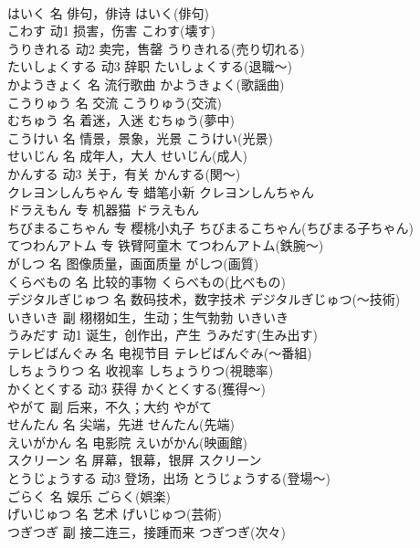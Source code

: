 \documentclass[8pt]{extreport}
\begin{document}
\begin{CJK}{UTF8}{min}
\\	はいく	名	俳句，俳诗	はいく(俳句)	
\\	こわす	动1	损害，伤害	こわす(壊す)	
\\	うりきれる	动2	卖完，售罄	うりきれる(売り切れる)	
\\	たいしょくする	动3	辞职	たいしょくする(退職～)	
\\	かようきょく	名	流行歌曲	かようきょく(歌謡曲)	
\\	こうりゅう	名	交流	こうりゅう(交流)	
\\	むちゅう	名	着迷，入迷	むちゅう(夢中)	
\\	こうけい	名	情景，景象，光景	こうけい(光景)	
\\	せいじん	名	成年人，大人	せいじん(成人)	
\\	かんする	动3	关于，有关	かんする(関～)	
\\	クレヨンしんちゃん	专	蜡笔小新	クレヨンしんちゃん	
\\	ドラえもん	专	机器猫	ドラえもん	
\\	ちびまるこちゃん	专	樱桃小丸子	ちびまるこちゃん(ちびまる子ちゃん)	
\\	てつわんアトム	专	铁臂阿童木	てつわんアトム(鉄腕～)	
\\	がしつ	名	图像质量，画面质量	がしつ(画質)	
\\	くらべもの	名	比较的事物	くらべもの(比べもの)	
\\	デジタルぎじゅつ	名	数码技术，数字技术	デジタルぎじゅつ(～技術)	
\\	いきいき	副	栩栩如生，生动；生气勃勃	いきいき	
\\	うみだす	动1	诞生，创作出，产生	うみだす(生み出す)	
\\	テレビばんぐみ	名	电视节目	テレビばんぐみ(～番組)	
\\	しちょうりつ	名	收视率	しちょうりつ(視聴率)	
\\	かくとくする	动3	获得	かくとくする(獲得～)	
\\	やがて	副	后来，不久；大约	やがて	
\\	せんたん	名	尖端，先进	せんたん(先端)	
\\	えいがかん	名	电影院	えいがかん(映画館)	
\\	スクリーン	名	屏幕，银幕，银屏	スクリーン	
\\	とうじょうする	动3	登场，出场	とうじょうする(登場～)	
\\	ごらく	名	娱乐	ごらく(娯楽)	
\\	げいじゅつ	名	艺术	げいじゅつ(芸術)	
\\	つぎつぎ	副	接二连三，接踵而来	つぎつぎ(次々)	

\end{CJK}
\end{document}

